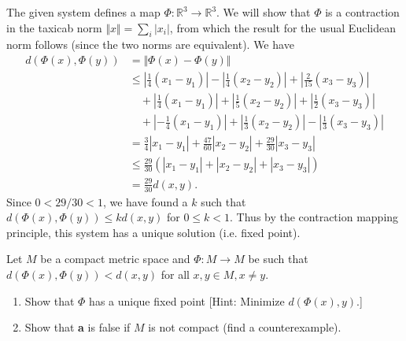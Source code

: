 \documentclass[10pt]{amsart}
\newenvironment{exercise}[1]{%
        \vspace{10mm}
        \renewcommand\themanualtheoreminner{#1}%
  \manualtheoreminner
}\hrulefill{\endmanualtheoreminner}
\begin{document}
The given system defines a map $\Phi: \mathbb{R}^3 \to \mathbb{R}^3$. We will show that $\Phi$ is a contraction in the taxicab norm $\Vert{x}\Vert = \sum_i |x_i|$, from which the result for the usual Euclidean norm follows (since the two norms are equivalent). We have
\begin{align*}
	d(\Phi(x), \Phi(y)) &= \Vert \Phi(x) - \Phi(y) \Vert \\
			    &\leq \left| \frac{1}{4} (x_1-y_1) \right| - \left| \frac{1}{4} (x_2-y_2)\right| + \left| \frac{2}{15} (x_3-y_3) \right| \\
			    &\quad + \left| \frac{1}{4} (x_1-y_1) \right| + \left| \frac{1}{5} (x_2-y_2)\right| + \left|\frac{1}{2} (x_3-y_3) \right| \\
			    &\quad + \left| -\frac{1}{4} (x_1-y_1)\right|+\left|\frac{1}{3} (x_2-y_2)\right|-\left|\frac{1}{3} (x_3-y_3) \right| \\
			    &= \frac{3}{4} |x_1-y_1|+ \frac{47}{60} |x_2-y_2| + \frac{29}{30} |x_3-y_3| \\
			    &\leq \frac{29}{30} \left( |x_1-y_1| + |x_2-y_2| + |x_3-y_3| \right) \\
			    &= \frac{29}{30} d(x,y).
\end{align*} Since $0 < 29/30 < 1$, we have found a $k$ such that $d(\Phi(x), \Phi(y)) \leq kd(x,y)$ for $0 \leq k < 1$. Thus by the contraction mapping principle, this system has a unique solution (i.e. fixed point).

\begin{exercise}{Page 283, Ex. 8}
	Let $M$ be a compact metric space and $\Phi:M \to M$ be such that $d(\Phi(x),\Phi(y)) < d(x,y)$ for all $x,y \in M, x \neq y$.
	\begin{enumerate}
		\item Show that $\Phi$ has a unique fixed point [Hint: Minimize $d(\Phi(x),y)$.]
		\item Show that \textbf{a} is false if $M$ is not compact (find a counterexample).
	\end{enumerate}
\end{exercise}
\end{document}
